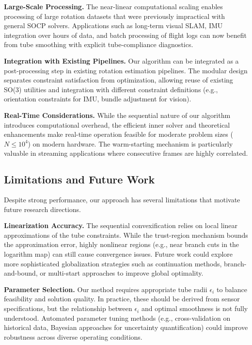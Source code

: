 \textbf{Large-Scale Processing.} The near-linear computational scaling enables processing of large rotation datasets that were previously impractical with general SOCP solvers. Applications such as long-term visual SLAM, IMU integration over hours of data, and batch processing of flight logs can now benefit from tube smoothing with explicit tube-compliance diagnostics.

\textbf{Integration with Existing Pipelines.} Our algorithm can be integrated as a post-processing step in existing rotation estimation pipelines. The modular design separates constraint satisfaction from optimization, allowing reuse of existing SO(3) utilities and integration with different constraint definitions (e.g., orientation constraints for IMU, bundle adjustment for vision).

\textbf{Real-Time Considerations.} While the sequential nature of our algorithm introduces computational overhead, the efficient inner solver and theoretical enhancements make real-time operation feasible for moderate problem sizes ($N \leq 10^4$) on modern hardware. The warm-starting mechanism is particularly valuable in streaming applications where consecutive frames are highly correlated.

\subsection{Limitations and Future Work}

Despite strong performance, our approach has several limitations that motivate future research directions.

\textbf{Linearization Accuracy.} The sequential convexification relies on local linear approximations of the tube constraints. While the trust-region mechanism bounds the approximation error, highly nonlinear regions (e.g., near branch cuts in the logarithm map) can still cause convergence issues. Future work could explore more sophisticated globalization strategies such as continuation methods, branch-and-bound, or multi-start approaches to improve global optimality.

\textbf{Parameter Selection.} Our method requires appropriate tube radii $\epsilon_i$ to balance feasibility and solution quality. In practice, these should be derived from sensor specifications, but the relationship between $\epsilon_i$ and optimal smoothness is not fully understood. Automated parameter tuning methods (e.g., cross-validation on historical data, Bayesian approaches for uncertainty quantification) could improve robustness across diverse operating conditions.

